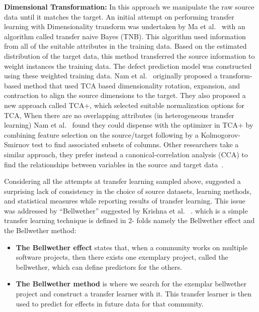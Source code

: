 \documentclass[10pt,journal,compsoc]{IEEEtran}
\newcommand{\bi}{\begin{itemize}}
\newcommand{\ei}{\end{itemize}}
\begin{document}
\textbf{Dimensional Transformation:} In this approach we manipulate the raw source data until it matches the target. An initial attempt on performing transfer learning with Dimensionality transform was undertaken by Ma et al.~\cite{Ma2012} with an algorithm called transfer naive Bayes (TNB). This algorithm used information from all of the suitable attributes in the training data. Based on the estimated distribution of the target data, this method transferred the source information to weight instances the training data. The defect prediction model was constructed using these weighted training data. Nam et al.~\cite{Nam13} originally proposed a transform-based method that used TCA based dimensionality rotation, expansion, and contraction to align the source dimensions to the target. They also proposed a new approach called TCA+, which selected suitable normalization options for TCA, When there are no overlapping attributes (in heterogeneous transfer learning) Nam et al.~\cite{Nam2015} found they could dispense with the optimizer in TCA+ by combining feature selection on the source/target following by a Kolmogorov-Smirnov test to find associated subsets of columns. Other researchers take a similar approach, they prefer instead a canonical-correlation analysis (CCA) to find the relationships between variables in the source and target data~\cite{jing2015heterogeneous}.


Considering all the attempts at transfer learning sampled above, suggested a surprising lack of consistency in the choice of source datasets, learning methods, and statistical measures while reporting results of transfer learning. This issue was addressed by ``Bellwether'' suggested by Krishna et al. ~\cite{krishna2017simpler,krishna16}. which is a simple transfer learning technique is defined in 2- folds namely the Bellwether effect and the Bellwether method:

\bi

    \item \textbf{The Bellwether effect} states that, when a community works on multiple software projects,  then there exists one exemplary project, called the bellwether, which can define predictors for the others.
    
    \item \textbf{The Bellwether method} is where we search for the exemplar bellwether project and construct a transfer learner with it. This transfer learner is then used to predict for effects in future data for that community.

\ei
\end{document}
